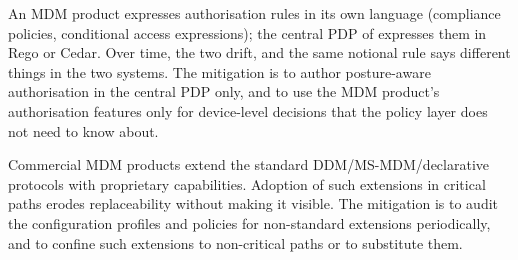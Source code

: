 \begin{pitfallbox}
\noindent An MDM product expresses authorisation rules in its own
language (compliance policies, conditional access expressions); the
central PDP of  expresses them in Rego or Cedar.
Over time, the two drift, and the same notional rule says different
things in the two systems. The mitigation is to author posture-aware
authorisation in the central PDP only, and to use the MDM
product's authorisation features only for device-level decisions
that the policy layer does not need to know about.
\end{pitfallbox}

\begin{pitfallbox}
\noindent Commercial MDM products extend the standard
DDM/MS-MDM/declarative protocols with proprietary capabilities.
Adoption of such extensions in critical paths erodes
replaceability without making it visible. The mitigation is to
audit the configuration profiles and policies for non-standard
extensions periodically, and to confine such extensions to
non-critical paths or to substitute them.
\end{pitfallbox}
